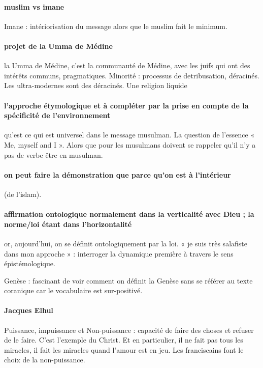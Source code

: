 \paragraph{muslim vs imane} Imane : intériorisation du message alors que le muslim fait le minimum.  
\paragraph{projet de la Umma de Médine} la Umma de Médine, c’est la communauté de Médine, avec les juifs qui ont des intérêts communs, pragmatiques.  Minorité : processus de detribusation, déracinés. Les ultra-modernes sont des déracinés. Une religion liquide 

\paragraph{l’approche étymologique et à compléter par la prise en compte de la spécificité de l’environnement } qu’est ce qui est universel dans le message musulman. La question de l’essence « Me, myself and I ». Alors que pour les musulmans doivent se rappeler qu’il n’y a pas de verbe être en musulman.

\paragraph{on peut faire la démonstration que parce qu’on est à l’intérieur } (de l’islam). 

\paragraph{affirmation ontologique normalement dans la verticalité avec Dieu ; la norme/loi étant dans l’horizontalité} or, aujourd’hui, on se définit ontologiquement par la loi. « je suis très salafiste dans mon approche » : interroger la dynamique première à travers le sens épistémologique. 
\begin{Ex}
Genèse : fascinant de voir comment on définit la Genèse sans se référer au texte coranique car le vocabulaire est sur-positivé. 
\end{Ex}

\paragraph{Jacques Elhul} Puissance, impuissance et Non-puissance : capacité de faire des choses et refuser de le faire. C’est l’exemple du Christ. Et en particulier, il ne fait pas tous les miracles, il fait les miracles quand l’amour est en jeu. Les franciscains font le choix de la non-puissance.

